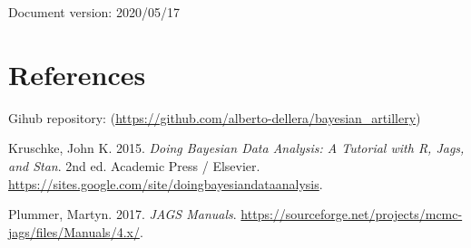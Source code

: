 \documentclass[]{article}
\begin{document}
Document version: 2020/05/17

\hypertarget{references}{%
\section{References}\label{references}}

Gihub repository:
(\url{https://github.com/alberto-dellera/bayesian_artillery})

\hypertarget{refs}{}
\leavevmode\hypertarget{ref-DBDA2E}{}%
Kruschke, John K. 2015. \emph{Doing Bayesian Data Analysis: A Tutorial
with R, Jags, and Stan}. 2nd ed. Academic Press / Elsevier.
\url{https://sites.google.com/site/doingbayesiandataanalysis}.

\leavevmode\hypertarget{ref-JAGSmanual}{}%
Plummer, Martyn. 2017. \emph{JAGS Manuals}.
\url{https://sourceforge.net/projects/mcmc-jags/files/Manuals/4.x/}.
\end{document}

